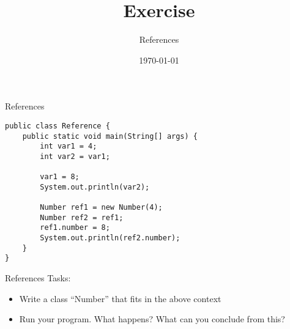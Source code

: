 


\title{Exercise}
\subtitle{References}
\date{\today}




\begin{frame}
    \titlepage
\end{frame}

\begin{frame}{References}
   \begin{lstlisting}
public class Reference {
    public static void main(String[] args) {
        int var1 = 4;
        int var2 = var1;

        var1 = 8;
        System.out.println(var2);

        Number ref1 = new Number(4);    
        Number ref2 = ref1;
        ref1.number = 8;
        System.out.println(ref2.number);
    }
}\end{lstlisting}
\end{frame}

\begin{frame}{References}
    Tasks:
    \begin{itemize}
        \item Write a class ``Number'' that fits in the above context
        \item Run your program. What happens? What can you conclude from this?
    \end{itemize}
\end{frame}



